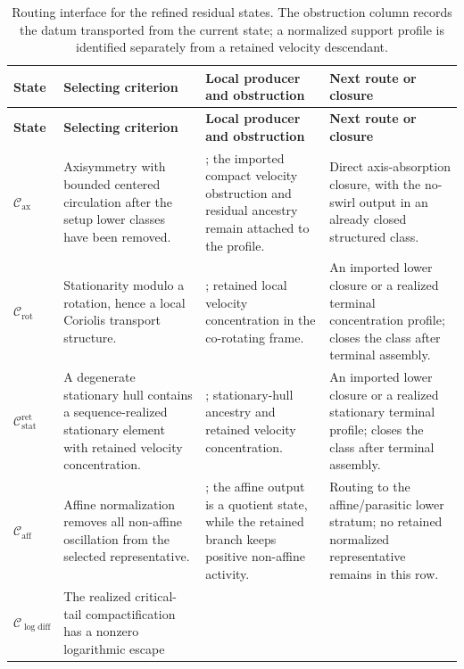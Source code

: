 \documentclass[11pt]{amsart}
\numberwithin{equation}{section}
\theoremstyle{plain}
\theoremstyle{definition}
\theoremstyle{remark}
\newcommand{\Cax}{\mathcal C_{\mathrm{ax}}}
\newcommand{\Crot}{\mathcal C_{\mathrm{rot}}}
\newcommand{\Cstat}{\mathcal C_{\mathrm{stat}}^{\mathrm{ret}}}
\newcommand{\Caff}{\mathcal C_{\mathrm{aff}}}
\newcommand{\Clogdiff}{\mathcal C_{\log\mathrm{diff}}}
\begin{document}
\begingroup
\scriptsize
\setlength{\tabcolsep}{3pt}
\renewcommand{\arraystretch}{1.18}
\begin{longtable}{@{}L{0.13\textwidth}L{0.25\textwidth}L{0.31\textwidth}L{0.25\textwidth}@{}}
\caption{Routing interface for the refined residual states.  The obstruction
column records the datum transported from the current state; a normalized
support profile is identified separately from a retained velocity descendant.}
\label{tab:typeI-residual-routing-interface}\\
\hline
\textbf{State} & \textbf{Selecting criterion} &
\textbf{Local producer and obstruction} & \textbf{Next route or closure}\\
\hline
\endfirsthead
\hline
\textbf{State} & \textbf{Selecting criterion} &
\textbf{Local producer and obstruction} & \textbf{Next route or closure}\\
\hline
\endhead
\hline
\endfoot
\(\Cax\) &
Axisymmetry with bounded centered circulation after the setup lower classes
have been removed. &
; the imported compact velocity obstruction and
residual ancestry remain attached to the profile. &
Direct axis-absorption closure, with the no-swirl output in an already closed
structured class.\\
\(\Crot\) &
Stationarity modulo a rotation, hence a local Coriolis transport structure. &
; retained local velocity concentration in
the co-rotating frame. &
An imported lower closure or a realized terminal concentration profile;
 closes the class after terminal assembly.\\
\(\Cstat\) &
A degenerate stationary hull contains a sequence-realized stationary element
with retained velocity concentration. &
;
stationary-hull ancestry and retained velocity concentration. &
An imported lower closure or a realized stationary terminal profile;
 closes the class after terminal assembly.\\
\(\Caff\) &
Affine normalization removes all non-affine oscillation from the selected
representative. &
;
the affine output is a quotient state, while the retained branch keeps
positive non-affine activity. &
Routing to the affine/parasitic lower stratum; no retained normalized
representative remains in this row.\\
\(\Clogdiff\) &
The realized critical-tail compactification has a nonzero logarithmic escape

\end{longtable}
\end{document}
